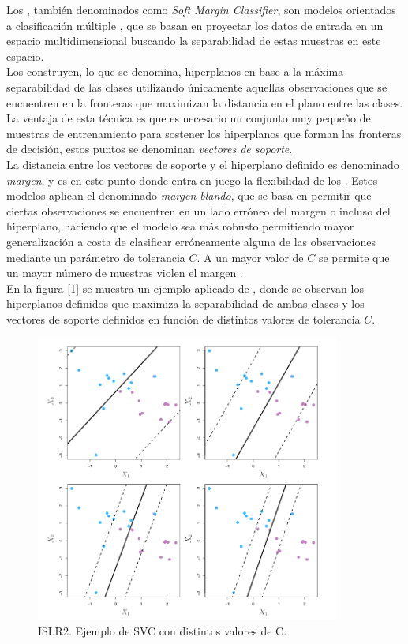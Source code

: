             Los , también denominados como \textit{Soft Margin Classifier}, son modelos orientados a clasificación múltiple \cite{SVC}, que se basan en proyectar los datos de entrada en un espacio multidimensional buscando la separabilidad de estas muestras en este espacio.\\

            Los  construyen, lo que se denomina, hiperplanos en base a la máxima separabilidad de las clases utilizando únicamente aquellas observaciones que se encuentren en la fronteras que maximizan la distancia en el plano entre las clases. La ventaja de esta técnica es que es necesario un conjunto muy pequeño de muestras de entrenamiento para sostener los hiperplanos que forman las fronteras de decisión, estos puntos se denominan \textit{vectores de soporte}.\\

            La distancia entre los vectores de soporte y el hiperplano definido es denominado \textit{margen}, y es en este punto donde entra en juego la flexibilidad de los . Estos modelos aplican el denominado \textit{margen blando}, que se basa en permitir que ciertas observaciones se encuentren en un lado erróneo del margen o incluso del hiperplano, haciendo que el modelo sea más robusto permitiendo mayor generalización a costa de clasificar erróneamente alguna de las observaciones mediante un parámetro de tolerancia $C$. A un mayor valor de $C$ se permite que un mayor número de muestras violen el margen \citep{ISLR2}.\\

            En la figura [\ref{SVCExampleImage}] se muestra un ejemplo aplicado de , donde se observan los hiperplanos definidos que maximiza la separabilidad de ambas clases y los vectores de soporte definidos en función de distintos valores de tolerancia $C$.

            \begin{figure}[h]
                \centering
                \includegraphics[width=10cm]{archivos/3.Tecnologias/SVC/SVCExample}
                \caption{ISLR2. Ejemplo de SVC con distintos valores de C.}
                \label{SVCExampleImage}
             \end{figure}

